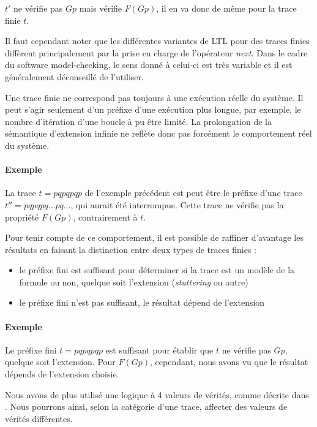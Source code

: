 \(t'\) ne vérifie pas \(G p\) mais vérifie \(F(G p)\), il en va donc de même
pour la trace finie \(t\).

Il faut cependant noter que les différentes variantes de \ac{LTL} pour des
traces finies diffèrent principalement par la prise en charge de
l'opérateur \emph{next}. Dans le cadre du software model-checking, le
sens donné à celui-ci est très variable et il est généralement
déconseillé de l'utiliser.

Une trace finie ne correspond pas toujours à une exécution réelle du système.
Il peut s'agir seulement d'un préfixe d'une exécution plus longue, par exemple,
le nombre d'itération d'une boucle à pu être limité. La prolongation de la
sémantique d'extension infinie ne reflète donc pas forcément le comportement
réel du système.

\paragraph{Exemple}
La trace \(t = pqpqpqp\) de l'exemple précédent est peut être le préfixe d'une
trace \(t'' = pqpqpq\dots pq\dots\), qui aurait été interrompue. Cette trace ne
vérifie pas la propriété \(F (G p)\), contrairement à \(t\).

Pour tenir compte de ce comportement, il est possible de raffiner d'avantage les
résultats en faisant la distinction entre deux types de traces finies :

\begin{itemize}
\item
  le préfixe fini est suffisant pour déterminer si la trace est un
  modèle de la formule ou non, quelque soit l'extension
  (\emph{stuttering} ou autre)
\item
  le préfixe fini n'est pas suffisant, le résultat dépend de l'extension
\end{itemize}

\paragraph{Exemple}
Le préfixe fini \(t = pqpqpqp\) est suffisant pour établir que \(t\) ne vérifie
pas \(G p\), quelque soit l'extension. Pour \(F (G p)\), cependant, nous avons
vu que le résultat dépends de l'extension choisie.

Nous avons de plus utilisé une logique à 4 valeurs de vérités, comme
décrite dans \cite{morse_ltl}. Nous pourrons ainsi, selon la catégorie d'une
trace, affecter des valeurs de vérités différentes.

